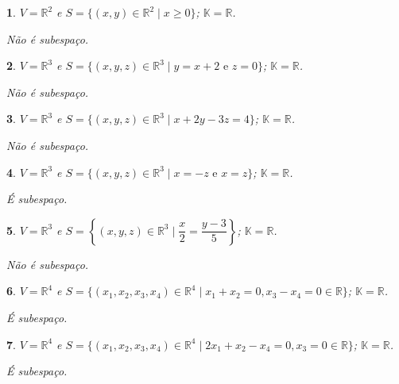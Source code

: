 \documentclass[12pt]{exam}
\newtheorem{exercicio}{}
\newcommand{\real}{\mathbb{R}}
\newcommand{\cp}[1]{\mathbb{#1}}
\begin{document}
\begin{exercicio}
$V = \real^2$ e $S = \{(x, y) \in \real^2 \mid x \ge 0\}$; $\cp{K} = \real$.
\begin{solucao}
  N\~ao \'e subespa\c{c}o.
\end{solucao}
\end{exercicio}

\begin{exercicio}
$V = \real^3$ e $S = \{(x, y, z) \in \real^3 \mid y = x + 2 \mbox{ e } z = 0\}$; $\cp{K} = \real$.
\begin{solucao}
  N\~ao \'e subespa\c{c}o.
\end{solucao}
\end{exercicio}

\begin{exercicio}
$V = \real^3$ e $S = \{(x, y, z) \in \real^3 \mid x + 2y -3z = 4\}$; $\cp{K} = \real$.
\begin{solucao}
  N\~ao \'e subespa\c{c}o.
\end{solucao}
\end{exercicio}

\begin{exercicio}
$V = \real^3$ e $S = \{(x, y, z) \in \real^3 \mid x = -z \mbox{ e } x = z\}$; $\cp{K} = \real$.
\begin{solucao}
  \'E subespa\c{c}o.
\end{solucao}
\end{exercicio}

\begin{exercicio}
$V = \real^3$ e $S = \left\{(x, y, z) \in \real^3 \mid \dfrac{x}{2} = \dfrac{y - 3}{5}\right\}$; $\cp{K} = \real$.
\begin{solucao}
  N\~ao \'e subespa\c{c}o.
\end{solucao}
\end{exercicio}

\begin{exercicio}
$V = \real^4$ e $S = \{(x_1, x_2, x_3, x_4) \in \real^4 \mid x_1 + x_2 = 0, x_3 - x_4 = 0 \in \real\}$; $\cp{K} = \real$.
\begin{solucao}
  \'E subespa\c{c}o.
\end{solucao}
\end{exercicio}

\begin{exercicio}
$V = \real^4$ e $S = \{(x_1, x_2, x_3, x_4) \in \real^4 \mid 2x_1 + x_2 - x_4 = 0, x_3 = 0 \in \real\}$; $\cp{K} = \real$.
\begin{solucao}
  \'E subespa\c{c}o.
\end{solucao}
\end{exercicio}
\end{document}
